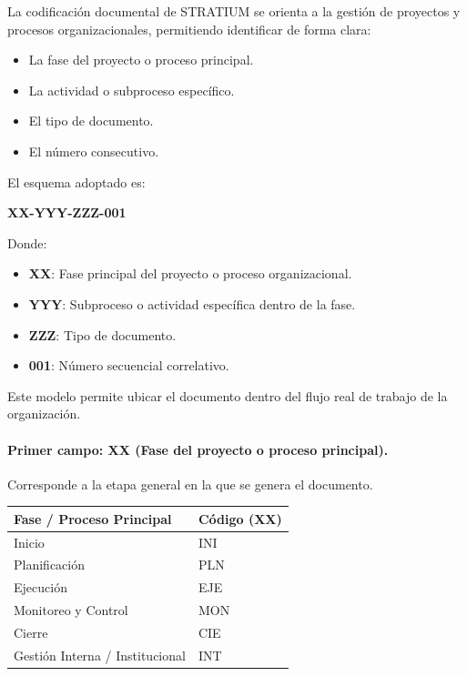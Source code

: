 \documentclass{encabezado}
\begin{document}
La codificación documental de STRATIUM se orienta a la gestión de proyectos y procesos organizacionales, permitiendo identificar de forma clara:

\begin{itemize}
    \item La fase del proyecto o proceso principal.
    \item La actividad o subproceso específico.
    \item El tipo de documento.
    \item El número consecutivo.
\end{itemize}

El esquema adoptado es:

\begin{center}
    \large\textbf{XX-YYY-ZZZ-001}
\end{center}

Donde:

\begin{itemize}
    \item \textbf{XX}: Fase principal del proyecto o proceso organizacional.
    \item \textbf{YYY}: Subproceso o actividad específica dentro de la fase.
    \item \textbf{ZZZ}: Tipo de documento.
    \item \textbf{001}: Número secuencial correlativo.
\end{itemize}

Este modelo permite ubicar el documento dentro del flujo real de trabajo de la organización.

\paragraph{Primer campo: XX (Fase del proyecto o proceso principal).}

Corresponde a la etapa general en la que se genera el documento.

\begin{center}
    \footnotesize
    \renewcommand{\arraystretch}{1.3}
    \begin{tabular}{p{7cm} p{2cm}}
        \hline
        \textbf{Fase / Proceso Principal} & \textbf{Código (XX)} \\
        \hline
        Inicio                            & INI                  \\
        Planificación                     & PLN                  \\
        Ejecución                         & EJE                  \\
        Monitoreo y Control               & MON                  \\
        Cierre                            & CIE                  \\
        Gestión Interna / Institucional   & INT                  \\
        \hline
    \end{tabular}
\end{center}
\end{document}
